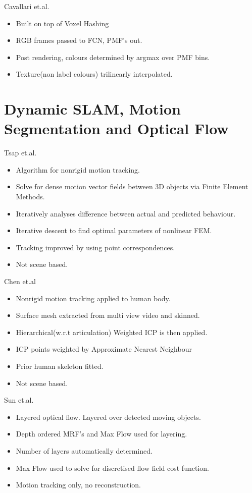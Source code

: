 Cavallari et.al. \cite{Cavallari2016}
\begin{itemize}
	\item Built on top of Voxel Hashing
	\item RGB frames passed to FCN\cite{Shelhamer2017}, PMF's out.
	\item Post rendering, colours determined by argmax over PMF bins.
	\item Texture(non label colours) trilinearly interpolated.
\end{itemize}

\section{Dynamic SLAM, Motion Segmentation and Optical Flow}
\label{sec:lit_review_dynamic}
Tsap et.al. \cite{Tsap2000}
\begin{itemize}
	\item Algorithm for nonrigid motion tracking.
	\item Solve for dense motion vector fields between 3D objects via Finite Element Methods. %
	\item Iteratively analyses difference between actual and predicted behaviour.
	\item Iterative descent to find optimal parameters of nonlinear FEM.
	\item Tracking improved by using point correspondences.
	\item Not scene based.
\end{itemize}

Chen et.al \cite{Chen2011}
\begin{itemize}
	\item Nonrigid motion tracking applied to human body.
	\item Surface mesh extracted from multi view video and skinned.
	\item Hierarchical(w.r.t articulation) Weighted ICP is then applied.
	\item ICP points weighted by Approximate Nearest Neighbour %
	\item Prior human skeleton fitted.
	\item Not scene based.
\end{itemize}

Sun et.al. \cite{Sun2012}
\begin{itemize}
	\item Layered optical flow. Layered over detected moving objects.
	\item Depth ordered MRF's and Max Flow used for layering.%
	\item Number of layers automatically determined.
	\item Max Flow used to solve for discretised flow field cost function.
	\item Motion tracking only, no reconstruction.
\end{itemize}

